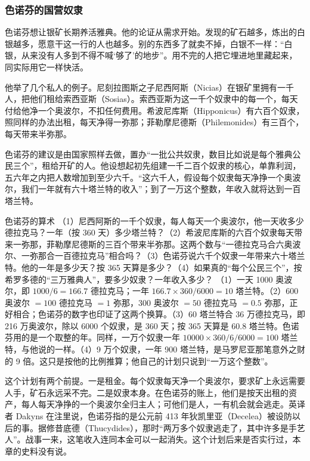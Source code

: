 \subsubsection{色诺芬的国营奴隶}
色诺芬想让银矿长期养活雅典。他的论证从需求开始。发现的矿石越多，炼出的白银越多，愿意干这一行的人也越多。别的东西多了就卖不掉，白银不一样：“白银，从来没有人多到不得不喊‘够了’的地步”。用不完的人把它埋进地里藏起来，同实际用它一样快活\cite{xenrev}。

他举了几个私人的例子。尼刻拉图斯之子尼西阿斯（Nicias）在银矿里拥有一千人，把他们租给索西亚斯（Sosias）。索西亚斯为这一千个奴隶中的每一个，每天付给他净一个奥波尔，不扣任何费用。希波尼库斯（Hipponicus）有六百个奴隶，照同样的办法出租，每天净得一弥那；菲勒摩尼德斯（Philemonides）有三百个，每天带来半弥那\cite{xenrev}。

色诺芬的建议是由国家照样去做，置办“一批公共奴隶，数目比如说是每个雅典公民三个”，租给开矿的人。他设想起初先组建一千二百个奴隶的核心，单靠利润，五六年之内把人数增加到至少六千。“这六千人，假设每个奴隶每天净挣一个奥波尔，我们一年就有六十塔兰特的收入”；到了一万这个整数，年收入就将达到一百塔兰特\cite{xenrev}。

\begin{example}{色诺芬的算术}\label{ex:greek-xenophon}
（1）尼西阿斯的一千个奴隶，每人每天一个奥波尔，他一天收多少德拉克马？一年（按 360 天）多少塔兰特？（2）希波尼库斯的六百个奴隶每天带来一弥那，菲勒摩尼德斯的三百个带来半弥那。这两个数与“一德拉克马合六奥波尔、一弥那合一百德拉克马”相合吗？（3）色诺芬说六千个奴隶一年带来六十塔兰特。他的一年是多少天？按 365 天算是多少？（4）如果真的“每个公民三个”，按希罗多德的“三万雅典人”，要多少奴隶？一年收入多少？
\solution （1）一天 1000 奥波尔，即 $1000/6=166.7$ 德拉克马；一年 $166.7\times360/6000=10$ 塔兰特。（2）600 奥波尔 $=100$ 德拉克马 $=1$ 弥那，300 奥波尔 $=50$ 德拉克马 $=0.5$ 弥那，正好相合；色诺芬的数字也印证了这两个换算。（3）60 塔兰特合 36 万德拉克马，即 216 万奥波尔，除以 6000 个奴隶，是 360 天；按 365 天算是 60.8 塔兰特。色诺芬用的是一个取整的年。同样，一万个奴隶一年 $10000\times360/6/6000=100$ 塔兰特，与他说的一样。（4）9 万个奴隶，一年 900 塔兰特，是马罗尼亚那笔意外之财的 9 倍。这只是按他的比例推算；他自己的计划只说到“一万这个整数”。
\end{example}

这个计划有两个前提。一是租金。每个奴隶每天净一个奥波尔，要求矿上永远需要人手，矿石永远采不完。二是奴隶本身。在色诺芬的账上，他们是按天出租的资产，每人每天净挣的一个奥波尔全归主人；可他们是人，一有机会就会逃走。英译者 Dakyns 在注里说，色诺芬指的是公元前 413 年狄凯里亚（Decelea）被设防以后的事。据修昔底德（Thucydides），那时“两万多个奴隶逃走了，其中许多是手艺人”\cite{xenrev}。战事一来，这笔收入连同本金可以一起消失。这个计划后来是否实行过，本章的史料没有说。

